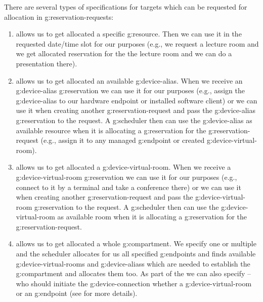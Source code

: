 There are several types of specifications for targets which can be requested for allocation in \glspl{g:reservation-request}:
\begin{enumerate}
\item {} allows us to get allocated a specific \gls{g:resource}. Then we can use it in the requested date/time slot for our purposes (e.g., we request a lecture room and we get allocated reservation for the the lecture room and we can do a presentation there).

\item {} allows us to get allocated an available \gls{g:device-alias}. When we receive an \gls{g:device-alias} \gls{g:reservation} we can use it for our purposes (e.g., assign the \gls{g:device-alias} to our hardware endpoint or installed software client) or we can use it when creating another \gls{g:reservation-request} and pass the \gls{g:device-alias} \gls{g:reservation} to the request. A \gls{g:scheduler} then can use the \gls{g:device-alias} as available resource when it is allocating a \gls{g:reservation} for the \gls{g:reservation-request} (e.g., assign it to any managed \gls{g:endpoint} or created \gls{g:device-virtual-room}). 

\item {} allows us to get allocated a \gls{g:device-virtual-room}. When we receive a \gls{g:device-virtual-room} \gls{g:reservation} we can use it for our purposes (e.g., connect to it by a terminal and take a conference there) or we can use it when creating another \gls{g:reservation-request} and pass the \gls{g:device-virtual-room} \gls{g:reservation} to the request. A \gls{g:scheduler} then can use the \gls{g:device-virtual-room} as available room when it is allocating a \gls{g:reservation} for the \gls{g:reservation-request}.

\item {} allows us to get allocated a whole \gls{g:compartment}. We specify one or multiple  and the scheduler allocates for us all specified \glspl{g:endpoint} and finds available \glspl{g:device-virtual-room} and \glspl{g:device-alias} which are needed to establish the \gls{g:compartment} and allocates them too. As part of the  we can also specify  -- who should initiate the \gls{g:device-connection} whether a \gls{g:device-virtual-room} or an \gls{g:endpoint} (see  for more details).


\end{enumerate}
